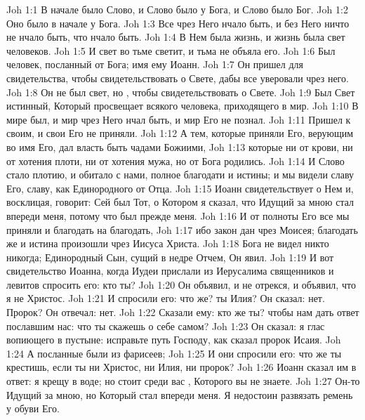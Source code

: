 \vs Joh 1:1 В начале было Слово, и Слово было у Бога, и Слово было Бог.
\vs Joh 1:2 Оно было в начале у Бога.
\vs Joh 1:3 Все чрез Него нчало быть, и без Него ничто не нчало быть, что нчало быть.
\vs Joh 1:4 В Нем была жизнь, и жизнь была свет человеков.
\vs Joh 1:5 И свет во тьме светит, и тьма не объяла его.
\rsbpar\vs Joh 1:6 Был человек, посланный от Бога; имя ему Иоанн.
\vs Joh 1:7 Он пришел для свидетельства, чтобы свидетельствовать о Свете, дабы все уверовали чрез него.
\vs Joh 1:8 Он не был свет, но , чтобы свидетельствовать о Свете.
\rsbpar\vs Joh 1:9 Был Свет истинный, Который просвещает всякого человека, приходящего в мир.
\vs Joh 1:10 В мире был, и мир чрез Него нчал быть, и мир Его не познал.
\vs Joh 1:11 Пришел к своим, и свои Его не приняли.
\vs Joh 1:12 А тем, которые приняли Его, верующим во имя Его, дал власть быть чадами Божиими,
\vs Joh 1:13 которые ни от крови, ни от хотения плоти, ни от хотения мужа, но от Бога родились.
\rsbpar\vs Joh 1:14 И Слово стало плотию, и обитало с нами, полное благодати и истины; и мы видели славу Его, славу, как Единородного от Отца.
\vs Joh 1:15 Иоанн свидетельствует о Нем и, восклицая, говорит: Сей был Тот, о Котором я сказал, что Идущий за мною стал впереди меня, потому что был прежде меня.
\vs Joh 1:16 И от полноты Его все мы приняли и благодать на благодать,
\vs Joh 1:17 ибо закон дан чрез Моисея; благодать же и истина произошли чрез Иисуса Христа.
\vs Joh 1:18 Бога не видел никто никогда; Единородный Сын, сущий в недре Отчем, Он явил.
\rsbpar\vs Joh 1:19 И вот свидетельство Иоанна, когда Иудеи прислали из Иерусалима священников и левитов спросить его: кто ты?
\vs Joh 1:20 Он объявил, и не отрекся, и объявил, что я не Христос.
\vs Joh 1:21 И спросили его: что же? ты Илия? Он сказал: нет. Пророк? Он отвечал: нет.
\vs Joh 1:22 Сказали ему: кто же ты? чтобы нам дать ответ пославшим нас: что ты скажешь о себе самом?
\vs Joh 1:23 Он сказал: я глас вопиющего в пустыне: исправьте путь Господу, как сказал пророк Исаия.
\vs Joh 1:24 А посланные были из фарисеев;
\vs Joh 1:25 И они спросили его: что же ты крестишь, если ты ни Христос, ни Илия, ни пророк?
\vs Joh 1:26 Иоанн сказал им в ответ: я крещу в воде; но стоит среди вас , Которого вы не знаете.
\vs Joh 1:27 Он-то Идущий за мною, но Который стал впереди меня. Я недостоин развязать ремень у обуви Его.
